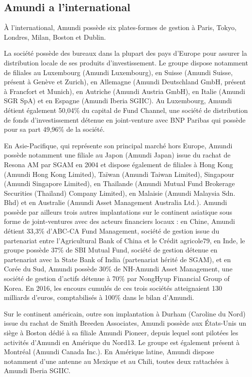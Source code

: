 \subsection{Amundi a l'international}
\par À l'international, Amundi possède six plates-formes de gestion à Paris, Tokyo, Londres, Milan, Boston et Dublin.
\par La société possède des bureaux dans la plupart des pays d'Europe pour assurer la distribution locale de ses produits d'investissement. Le groupe dispose notamment de filiales au Luxembourg (Amundi Luxembourg), en Suisse (Amundi Suisse, présent à Genève et Zurich), en Allemagne (Amundi Deutschland GmbH, présent à Francfort et Munich), en Autriche (Amundi Austria GmbH), en Italie (Amundi SGR SpA) et en Espagne (Amundi Iberia SGIIC). Au Luxembourg, Amundi détient également 50,04\% du capital de Fund Channel, une société de distribution de fonds d'investissement détenue en joint-venture avec BNP Paribas qui possède pour sa part 49,96\% de la société.
\par En Asie-Pacifique, qui représente son principal marché hors Europe, Amundi possède notamment une filiale au Japon (Amundi Japan) issue du rachat de Resona AM par SGAM en 2004 et dispose également de filiales à Hong Kong (Amundi Hong Kong Limited), Taïwan (Amundi Taiwan Limited), Singapour (Amundi Singapore Limited), en Thaïlande (Amundi Mutual Fund Brokerage Securities (Thailand) Company Limited), en Malaisie (Amundi Malaysia Sdn. Bhd) et en Australie (Amundi Asset Management Australia Ltd.). Amundi possède par ailleurs trois autres implantations sur le continent asiatique sous forme de joint-ventures avec des acteurs financiers locaux : en Chine, Amundi détient 33,3\% d'ABC-CA Fund Management, société de gestion issue du partenariat entre l'Agricultural Bank of China et le Crédit agricole79, en Inde, le groupe possède 37\% de SBI Mutual Fund, société de gestion détenue en partenariat avec la State Bank of India (partenariat hérité de SGAM), et en Corée du Sud, Amundi possède 30\% de NH-Amundi Asset Management, une société de gestion d'actifs détenue à 70\% par NongHyup Financial Group of Korea. En 2016, les encours cumulés de ces trois sociétés atteignaient 130 milliards d'euros, comptabilisés à 100\% dans le bilan d'Amundi.
\par Sur le continent américain, outre son implantation à Durham (Caroline du Nord) issue du rachat de Smith Breeden Associates, Amundi possède aux États-Unis un siège à Boston dédié à sa filiale Amundi Pioneer, depuis lequel sont pilotées les activités d'Amundi en Amérique du Nord13. Le groupe est également présent à Montréal (Amundi Canada Inc.). En Amérique latine, Amundi dispose notamment d'une antenne au Mexique et au Chili, toutes deux rattachées à Amundi Iberia SGIIC.
